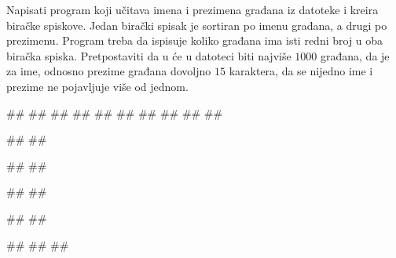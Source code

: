 \begin{Answer}[ref=3_19]
\end{Answer}
\begin{Exercise}[label=3_20]
  Napisati program koji učitava imena i prezimena građana iz datoteke  i kreira biračke
  spiskove. Jedan birački spisak je sortiran po imenu građana, a drugi
  po prezimenu. Program treba da ispisuje koliko građana ima isti
  redni broj u oba biračka spiska. Pretpostaviti da u će u datoteci 
  biti najviše $1000$ građana, da je za ime, odnosno prezime građana 
  dovoljno $15$ karaktera, da se nijedno ime i prezime ne pojavljuje više od jednom.

\begin{minitest}
\begin{test}{1}
##    
##
##
##
##
##
##
##
##
##

#\naslovIzlaz#
##
\end{test}
\end{minitest}
\begin{minitest}
\begin{test}{2}
##
##
  
#\naslovIzlaz#
##
\end{test}
\end{minitest}
\begin{minitest}
\begin{test}{3}
##
##
  
#\naslovIzlazZaGresku#
##
##
\end{test}
\end{minitest}
  
\end{Exercise}

